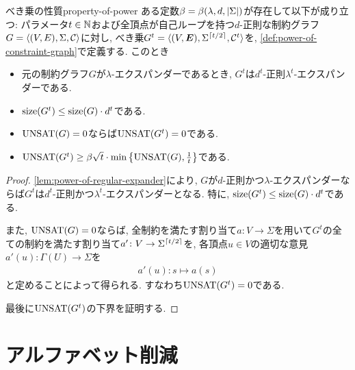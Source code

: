 \begin{lemma}{べき乗の性質}{property-of-power}
  ある定数$\beta=\beta(\lambda,d,\abs{\Sigma})$が存在して以下が成り立つ:
  パラメータ$t\in\mathbb{N}$および全頂点が自己ループを持つ$d$-正則な制約グラフ$G=\langle(V,E),\Sigma,\mathcal{C}\rangle$に対し, べき乗$G^t = \langle(V,\boldsymbol{E}),\Sigma^{\lceil t/2\rceil},\mathcal{C}^t\rangle$を, \cref{def:power-of-constraint-graph}で定義する.
  このとき
  \begin{itemize}
    \item 元の制約グラフ$G$が$\lambda$-エクスパンダーであるとき, $G^t$は$d^t$-正則$\lambda^t$-エクスパンダーである.
    \item $\mathrm{size}(G^t) \le \mathrm{size}(G)\cdot d^t$である.
    \item $\mathrm{UNSAT}(G)=0$ならば$\mathrm{UNSAT}(G^t)=0$である.
    \item $\mathrm{UNSAT}(G^t) \ge \beta\sqrt{t}\cdot \min\qty{ \mathrm{UNSAT}(G), \frac{1}{t} }$である.
  \end{itemize}
\end{lemma}
\begin{proof}

\cref{lem:power-of-regular-expander}により, $G$が$d$-正則かつ$\lambda$-エクスパンダーならば$G^t$は$d^t$-正則かつ$\lambda^t$-エクスパンダーとなる.
特に, $\mathrm{size}(G^t) \le \mathrm{size}(G)\cdot d^t$である.

また, $\mathrm{UNSAT}(G)=0$ならば, 全制約を満たす割り当て$a\colon V \to \Sigma$を用いて$G^t$の全ての制約を満たす割り当て$a'\colon V \to \Sigma^{\lceil t/2\rceil}$を, 各頂点$u\in V$の適切な意見$a'(u)\colon\Gamma(U)\to\Sigma$を
\begin{align*}
  a'(u)\colon s \mapsto a(s)
\end{align*}
と定めることによって得られる.
すなわち$\mathrm{UNSAT}(G^t)=0$である.

最後に$\mathrm{UNSAT}(G^t)$の下界を証明する.


\end{proof}

\section{アルファベット削減}



